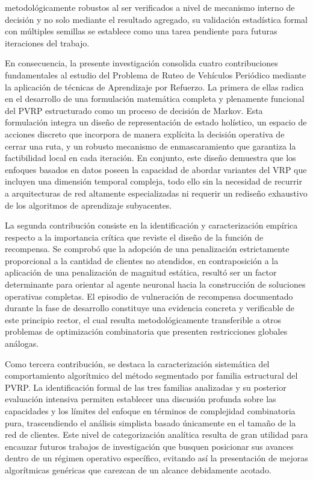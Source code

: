metodológicamente robustos al ser verificados a nivel de mecanismo interno de decisión y no solo mediante el resultado agregado, su validación estadística formal con múltiples semillas se establece como una tarea pendiente para futuras iteraciones del trabajo.

En consecuencia, la presente investigación consolida cuatro contribuciones fundamentales al estudio del Problema de Ruteo de Vehículos Periódico mediante la aplicación de técnicas de Aprendizaje por Refuerzo. La primera de ellas radica en el desarrollo de una formulación matemática completa y plenamente funcional del PVRP estructurado como un proceso de decisión de Markov. Esta formulación integra un diseño de representación de estado holístico, un espacio de acciones discreto que incorpora de manera explícita la decisión operativa de cerrar una ruta, y un robusto mecanismo de enmascaramiento que garantiza la factibilidad local en cada iteración. En conjunto, este diseño demuestra que los enfoques basados en datos poseen la capacidad de abordar variantes del VRP que incluyen una dimensión temporal compleja, todo ello sin la necesidad de recurrir a arquitecturas de red altamente especializadas ni requerir un rediseño exhaustivo de los algoritmos de aprendizaje subyacentes. 

La segunda contribución consiste en la identificación y caracterización empírica respecto a la importancia crítica que reviste el diseño de la función de recompensa. Se comprobó que la adopción de una penalización estrictamente proporcional a la cantidad de clientes no atendidos, en contraposición a la aplicación de una penalización de magnitud estática, resultó ser un factor determinante para orientar al agente neuronal hacia la construcción de soluciones operativas completas. El episodio de vulneración de recompensa documentado durante la fase de desarrollo constituye una evidencia concreta y verificable de este principio rector, el cual resulta metodológicamente transferible a otros problemas de optimización combinatoria que presenten restricciones globales análogas. 

Como tercera contribución, se destaca la caracterización sistemática del comportamiento algorítmico del método segmentado por familia estructural del PVRP. La identificación formal de las tres familias analizadas y su posterior evaluación intensiva permiten establecer una discusión profunda sobre las capacidades y los límites del enfoque en términos de complejidad combinatoria pura, trascendiendo el análisis simplista basado únicamente en el tamaño de la red de clientes. Este nivel de categorización analítica resulta de gran utilidad para encauzar futuros trabajos de investigación que busquen posicionar sus avances dentro de un régimen operativo específico, evitando así la presentación de mejoras algorítmicas genéricas que carezcan de un alcance debidamente acotado. 

